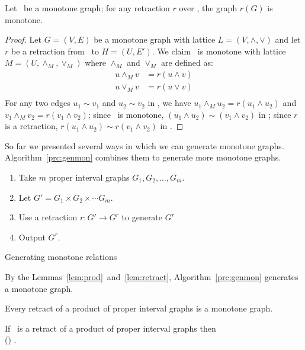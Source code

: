 \begin{lemma}
Let \mG\ be a monotone graph; for any retraction \(r\) over \mG, the graph
\(r(G)\) is monotone.
\end{lemma}

\begin{proof}
Let \(G=(V,E)\) be a monotone graph with lattice \(L=(V, \wedge,\vee)\) and
let \(r\) be a retraction from \mG\ to \(H=(U,E')\)\@. We claim
\mH\ is monotone with lattice \(M=(U,\wedge_M, \vee_M)\) where
\(\wedge_M\) and \(\vee_M\) are defined as:
\begin{eqnarray*}
u \wedge_M v &= r(u \wedge v) \\
u \vee_M v &= r(u \vee v) \\
\end{eqnarray*}
For any two edges \(u_1 \sim v_1\) and \(u_2 \sim v_2\) in \mH,
we have \(u_1 \wedge_M u_2 = r(u_1 \wedge u_2)\) and \(v_1 \wedge_M v_2 = r(v_1 \wedge v_2)\);
since \mG\ is monotone, \((u_1 \wedge u_2) \sim (v_1 \wedge v_2)\) in \mG;
since \(r\) is a retraction, \(r(u_1 \wedge u_2) \sim r(v_1 \wedge v_2)\) in \mH\@.
\end{proof}

So far we presented several ways in which we can generate monotone graphs.
Algorithm~\ref{prc:genmon} combines them to generate more monotone graphs.
\begin{algorithm}
\begin{enumerate}
\item Take \(m\) proper interval graphs \(G_1,G_2,\dotsc,G_m\)\@.
\item Let \(G' = G_1 \times G_2 \times \dotsb G_m\)\@.
\item Use a retraction \(r:G' \to G^r\) to generate \(G^r\)
\item Output \(G^r\)\@.
\end{enumerate}
\caption{Generating monotone relations}\label{prc:genmon}
\end{algorithm}

By the Lemmas~\ref{lem:prod}~and~\ref{lem:retract}, Algorithm~\ref{prc:genmon} generates a monotone graph.

\begin{cor}
Every retract of a product of proper interval graphs is a monotone graph.
\end{cor}

\begin{cor}
If \mG\ is a retract of a product of proper interval graphs then\\ \chom(\mH) \maple \cbis\@.
\end{cor}

